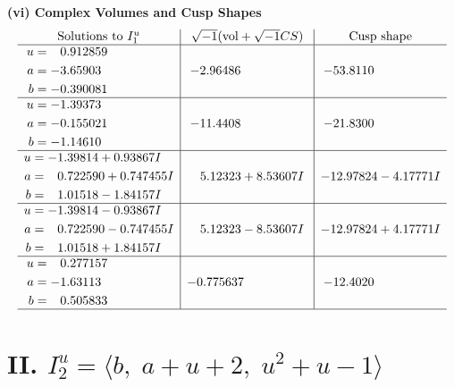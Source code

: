 \documentclass[1p]{elsarticle_modified}
\theoremstyle{definition}
\newcommand{\I}{\sqrt{-1}}
\begin{document}
\newpage\flushleft \textbf{(vi) Complex Volumes and Cusp Shapes}
$$\begin{array}{c|c|c}  
\text{Solutions to }I^u_{1}& \I (\text{vol} + \sqrt{-1}CS) & \text{Cusp shape}\\
 \hline 
\begin{aligned}
u &= \phantom{-}0.912859\phantom{ +0.000000I} \\
a &= -3.65903\phantom{ +0.000000I} \\
b &= -0.390081\phantom{ +0.000000I}\end{aligned}
 & -2.96486\phantom{ +0.000000I} & -53.8110\phantom{ +0.000000I} \\ \hline\begin{aligned}
u &= -1.39373\phantom{ +0.000000I} \\
a &= -0.155021\phantom{ +0.000000I} \\
b &= -1.14610\phantom{ +0.000000I}\end{aligned}
 & -11.4408\phantom{ +0.000000I} & -21.8300\phantom{ +0.000000I} \\ \hline\begin{aligned}
u &= -1.39814 + 0.93867 I \\
a &= \phantom{-}0.722590 + 0.747455 I \\
b &= \phantom{-}1.01518 - 1.84157 I\end{aligned}
 & \phantom{-}5.12323 + 8.53607 I & -12.97824 - 4.17771 I \\ \hline\begin{aligned}
u &= -1.39814 - 0.93867 I \\
a &= \phantom{-}0.722590 - 0.747455 I \\
b &= \phantom{-}1.01518 + 1.84157 I\end{aligned}
 & \phantom{-}5.12323 - 8.53607 I & -12.97824 + 4.17771 I \\ \hline\begin{aligned}
u &= \phantom{-}0.277157\phantom{ +0.000000I} \\
a &= -1.63113\phantom{ +0.000000I} \\
b &= \phantom{-}0.505833\phantom{ +0.000000I}\end{aligned}
 & -0.775637\phantom{ +0.000000I} & -12.4020\phantom{ +0.000000I}\\
 \hline 
 \end{array}$$\newpage\newpage\renewcommand{\arraystretch}{1}
\centering \section*{II. $I^u_{2}= \langle b,\;a+u+2,\;u^2+u-1 \rangle$}
\end{document}
